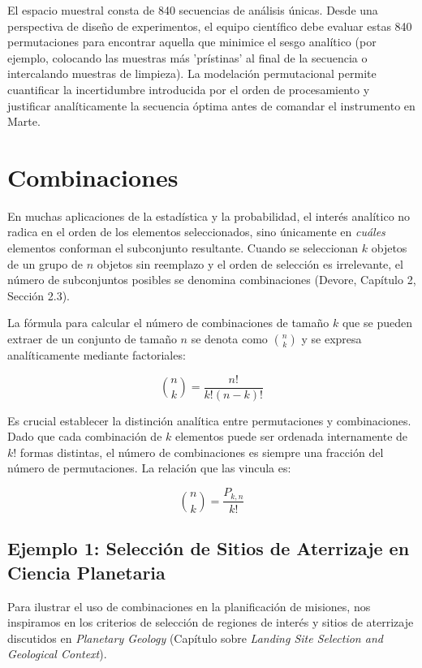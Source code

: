 El espacio muestral consta de 840 secuencias de análisis únicas. Desde una perspectiva de diseño de experimentos, el equipo científico debe evaluar estas 840 permutaciones para encontrar aquella que minimice el sesgo analítico (por ejemplo, colocando las muestras más 'prístinas' al final de la secuencia o intercalando muestras de limpieza). La modelación permutacional permite cuantificar la incertidumbre introducida por el orden de procesamiento y justificar analíticamente la secuencia óptima antes de comandar el instrumento en Marte.


\section{Combinaciones}

En muchas aplicaciones de la estadística y la probabilidad, el interés analítico no radica en el orden de los elementos seleccionados, sino únicamente en \textit{cuáles} elementos conforman el subconjunto resultante. Cuando se seleccionan $k$ objetos de un grupo de $n$ objetos sin reemplazo y el orden de selección es irrelevante, el número de subconjuntos posibles se denomina combinaciones (Devore, Capítulo 2, Sección 2.3). 

La fórmula para calcular el número de combinaciones de tamaño $k$ que se pueden extraer de un conjunto de tamaño $n$ se denota como $\binom{n}{k}$ y se expresa analíticamente mediante factoriales:

$$ \binom{n}{k} = \frac{n!}{k!(n-k)!} $$

Es crucial establecer la distinción analítica entre permutaciones y combinaciones. Dado que cada combinación de $k$ elementos puede ser ordenada internamente de $k!$ formas distintas, el número de combinaciones es siempre una fracción del número de permutaciones. La relación que las vincula es:

$$ \binom{n}{k} = \frac{P_{k,n}}{k!} $$

\subsection{Ejemplo 1: Selección de Sitios de Aterrizaje en Ciencia Planetaria}

Para ilustrar el uso de combinaciones en la planificación de misiones, nos inspiramos en los criterios de selección de regiones de interés y sitios de aterrizaje discutidos en \textit{Planetary Geology} (Capítulo sobre \textit{Landing Site Selection and Geological Context}). 

